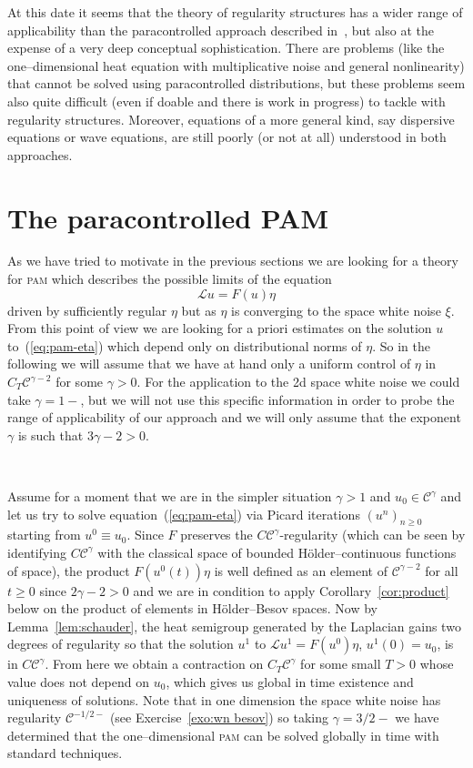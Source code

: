 \documentclass[a4paper,11pt]{article}
\newcommand{\tmname}[1]{\textsc{#1}}
\newcommand{\LL}{\mathscr{L}}
\newcommand{\CC}{\mathscr{C}}
\begin{document}
At this date it seems that the theory of regularity structures has a wider
range of applicability than the paracontrolled approach described
in~{\cite{Gubinelli2012}}, but also at the expense of a very deep conceptual
sophistication. There are problems (like the one--dimensional heat equation
with multiplicative noise and general nonlinearity) that cannot be solved
using paracontrolled distributions, but these problems seem also quite
difficult (even if doable and there is work in progress) to tackle with regularity
structures. Moreover, equations of a more general kind, say dispersive
equations or wave equations, are still poorly (or not at all) understood in
both approaches.

\section{The paracontrolled PAM}

As we have tried to motivate in the previous sections we are looking for a
theory for {\tmname{pam}} which describes the possible limits of the equation
\begin{equation}
  \LL u = F (u) \eta \label{eq:pam-eta}
\end{equation}
driven by sufficiently regular $\eta$ but as $\eta$ is converging to the space
white noise $\xi$. From this point of view we are looking for a priori
estimates on the solution $u$ to~(\ref{eq:pam-eta}) which depend only on
distributional norms of $\eta$. So in the following we will assume that we
have at hand only a uniform control of $\eta$ in $C_T \CC^{\gamma - 2}$ for
some $\gamma > 0$. For the application to the 2d space white noise we could
take $\gamma = 1 -$, but we will not use this specific information in order to
probe the range of applicability of our approach and we will only assume that
the exponent $\gamma$ is such that $3 \gamma - 2 > 0$.

\

Assume for a moment that we are in the simpler situation $\gamma > 1$ and
$u_0 \in \CC^{\gamma}$ and let us try to solve equation~(\ref{eq:pam-eta}) via
Picard iterations $(u^n)_{n \geqslant 0}$ starting from $u^0 \equiv u_0$.
Since $F$ preserves the $C \CC^{\gamma}$-regularity (which can be seen by
identifying $C \CC^{\gamma}$ with the classical space of bounded
H{\"o}lder--continuous functions of space), the product $F (u^0 (t)) \eta$ is
well defined as an element of $\CC^{\gamma - 2}$ for all $t \geqslant 0$ since
$2 \gamma - 2 > 0$ and we are in condition to apply
Corollary~\ref{cor:product} below on the product of elements in
H{\"o}lder--Besov spaces. Now by Lemma~\ref{lem:schauder}, the heat semigroup generated by the Laplacian gains
two degrees of regularity so that the solution $u^1$ to $\LL u^1 = F (u^0)
\eta$, $u^1 (0) = u_0$, is in $C \CC^{\gamma}$. From here we obtain a
contraction on $C_T \CC^{\gamma}$ for some small $T > 0$ whose value does not
depend on $u_0$, which gives us global in time existence and uniqueness of
solutions. Note that in one dimension the space white noise has regularity
$\CC^{- 1 / 2 -}$ (see Exercise~\ref{exo:wn besov}) so taking $\gamma = 3 / 2
-$ we have determined that the one--dimensional {\tmname{pam}} can be solved
globally in time with standard techniques.
\end{document}
